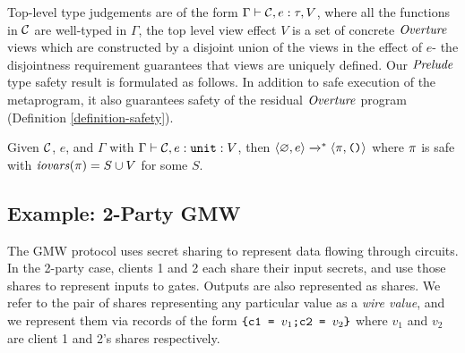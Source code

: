 Top-level type judgements are of the form $\Gamma \vdash \mathcal{C}, e
: \tau, V$, where all the functions in $\mathcal{C}$ are well-typed in
$\Gamma$, the top level view effect $V$ is a set of concrete
$\mathit{Overture}$ views which are constructed by a disjoint union of the views
in the effect of $e$- the disjointness requirement guarantees that
views are uniquely defined. Our $\mathit{Prelude}$ type safety result is
formulated as follows. In addition to safe execution of the
metaprogram, it also guarantees safety of the residual $\mathit{Overture}$
program (Definition \ref{definition-safety}).
\begin{theorem}
  \label{theorem-metalang-safety}
  Given $\mathcal{C}$, $e$, and $\Gamma$ with $\Gamma \vdash \mathcal{C},e : \mathtt{unit} : V$,
  then $\langle \varnothing,e \rangle \xrightarrow{}^{*} \langle \pi,\texttt{()} \rangle$ where
  $\pi$ is safe with $\mathit{iovars}(\pi) = S \cup V$ for some $S$.
\end{theorem}

\subsection{Example: 2-Party GMW}
\label{section-metalang-gmw}





The GMW protocol uses secret sharing to represent data flowing through
circuits. In the 2-party case, clients 1 and 2 each share their input
secrets, and use those shares to represent inputs to gates. Outputs
are also represented as shares. We refer to the pair of shares
representing any particular value as a \emph{wire value}, and
we represent them via records of the form
$
\texttt{\{c1 = } v_1\texttt{;c2 = } v_2\texttt{\}} 
$
where $v_1$ and $v_2$ are client 1 and 2's shares respectively.

